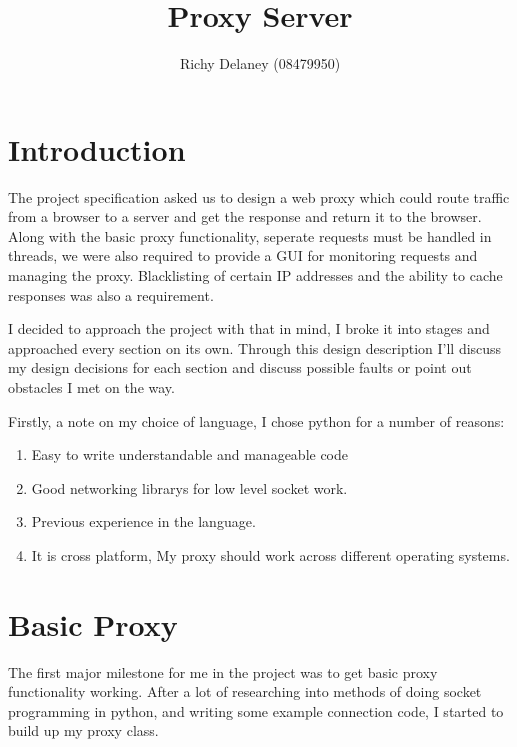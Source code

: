 \documentclass{article}
\title{ Proxy Server}
\author{ Richy Delaney (08479950)}
\begin{document}
 \maketitle 




\section*{ Introduction}


The project specification asked us to design a web proxy which could route traffic from a browser to a server and get the response and return it to the browser. Along with the basic proxy functionality, seperate requests must be handled in threads, we were also required to provide a GUI for monitoring requests and managing the proxy. Blacklisting of certain IP addresses and the ability to cache responses was also a requirement.



I decided to approach the project with that in mind, I broke it into stages and approached every section on its own. Through this design description I'll discuss my design decisions for each section and discuss possible faults or point out obstacles I met on the way.



Firstly, a note on my choice of language, I chose python for a number of reasons:



\begin{enumerate}
\item  Easy to write understandable and manageable code
\item  Good networking librarys for low level socket work.
\item  Previous experience in the language.
\item  It is cross platform, My proxy should work across different operating systems.
\end{enumerate}


\section*{ Basic Proxy}


The first major milestone for me in the project was to get basic proxy functionality working. After a lot of researching into methods of doing socket programming in python, and writing some example connection code, I started to build up my proxy class. 
\end{document}

